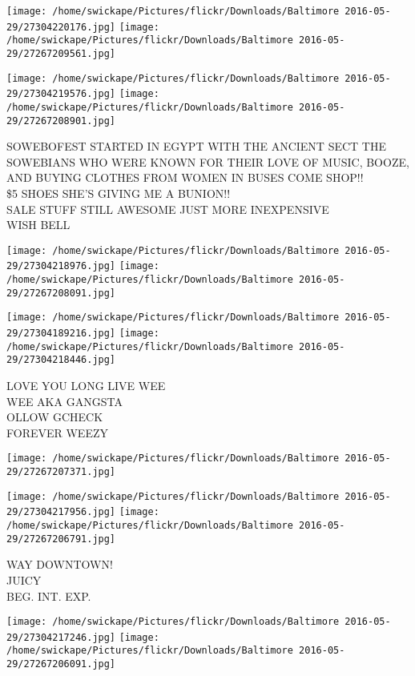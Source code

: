\documentclass[10pt,letterpaper]{article}
\begin{document}
\texttt{[image: /home/swickape/Pictures/flickr/Downloads/Baltimore 2016-05-29/27304220176.jpg]}
\texttt{[image: /home/swickape/Pictures/flickr/Downloads/Baltimore 2016-05-29/27267209561.jpg]}

\texttt{[image: /home/swickape/Pictures/flickr/Downloads/Baltimore 2016-05-29/27304219576.jpg]}
\texttt{[image: /home/swickape/Pictures/flickr/Downloads/Baltimore 2016-05-29/27267208901.jpg]}

SOWEBOFEST STARTED IN EGYPT WITH THE ANCIENT SECT THE SOWEBIANS WHO WERE KNOWN FOR THEIR LOVE OF MUSIC, BOOZE, AND BUYING CLOTHES FROM WOMEN IN BUSES COME SHOP!!\\
\$5 SHOES SHE'S GIVING ME A BUNION!!\\
SALE STUFF STILL AWESOME JUST MORE INEXPENSIVE\\
WISH BELL
\pagebreak

\texttt{[image: /home/swickape/Pictures/flickr/Downloads/Baltimore 2016-05-29/27304218976.jpg]}
\texttt{[image: /home/swickape/Pictures/flickr/Downloads/Baltimore 2016-05-29/27267208091.jpg]}

\texttt{[image: /home/swickape/Pictures/flickr/Downloads/Baltimore 2016-05-29/27304189216.jpg]}
\texttt{[image: /home/swickape/Pictures/flickr/Downloads/Baltimore 2016-05-29/27304218446.jpg]}

LOVE YOU LONG LIVE WEE\\
WEE AKA GANGSTA\\
OLLOW GCHECK\\
FOREVER WEEZY
\pagebreak

\texttt{[image: /home/swickape/Pictures/flickr/Downloads/Baltimore 2016-05-29/27267207371.jpg]}

\vspace{0.25in}
\texttt{[image: /home/swickape/Pictures/flickr/Downloads/Baltimore 2016-05-29/27304217956.jpg]}
\texttt{[image: /home/swickape/Pictures/flickr/Downloads/Baltimore 2016-05-29/27267206791.jpg]}

WAY DOWNTOWN!\\
JUICY\\
BEG. INT. EXP.
\pagebreak

\texttt{[image: /home/swickape/Pictures/flickr/Downloads/Baltimore 2016-05-29/27304217246.jpg]}
\texttt{[image: /home/swickape/Pictures/flickr/Downloads/Baltimore 2016-05-29/27267206091.jpg]}
\end{document}
